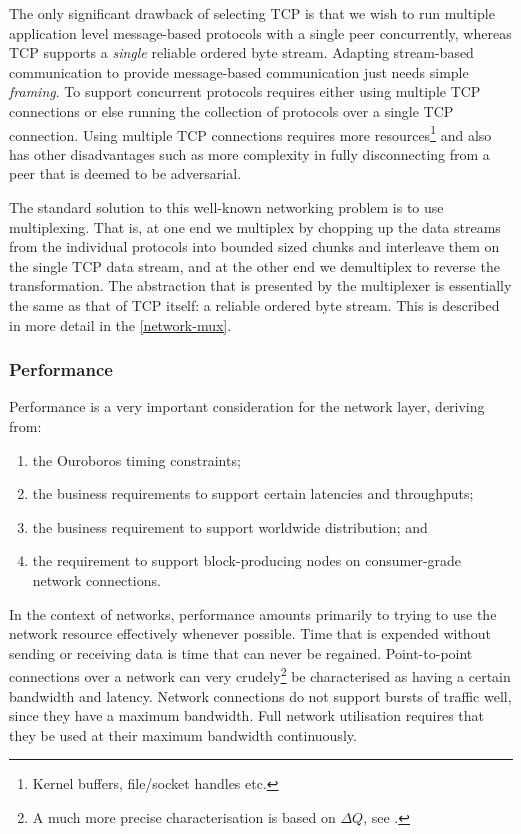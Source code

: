 \documentclass[11pt,a4paper]{article}
\begin{document}
The only significant drawback of selecting TCP is that we wish to run
multiple application level message-based protocols with a single peer
concurrently, whereas TCP supports a \emph{single} reliable ordered byte
stream. Adapting stream-based communication to provide message-based
communication just needs simple \emph{framing}. To support concurrent
protocols requires either using multiple TCP connections or else running
the collection of protocols over a single TCP connection. Using multiple
TCP connections requires more resources\footnote{Kernel buffers,
  file/socket handles etc.} and also has other disadvantages such as
more complexity in fully disconnecting from a peer that is deemed to be
adversarial.

The standard solution to this well-known networking problem is to use
multiplexing. That is, at one end we multiplex by chopping up the data
streams from the individual protocols into bounded sized chunks and
interleave them on the single TCP data stream, and at the other end we
demultiplex to reverse the transformation. The abstraction that is
presented by the multiplexer is essentially the same as that of TCP
itself: a reliable ordered byte stream. This is described in more detail
in the \cref{network-mux}.

\subsubsection{Performance}
\label{performance}

Performance is a very important consideration for the network layer,
deriving from:

\begin{enumerate}
\item
  the Ouroboros timing constraints;
\item
  the business requirements to support certain latencies and
  throughputs;
\item
  the business requirement to support worldwide distribution; and
\item
  the requirement to support block-producing nodes on consumer-grade
  network connections.
\end{enumerate}

In the context of networks, performance amounts primarily to trying to
use the network resource effectively whenever possible. Time that is
expended without sending or receiving data is time that can never be
regained. Point-to-point connections over a network can very
crudely\footnote{A much more precise characterisation is based on $\Delta{}Q$,
  see \cite{Comp20}.} be characterised as having a certain bandwidth and
latency. Network connections do not support bursts of traffic well,
since they have a maximum bandwidth. Full network utilisation requires
that they be used at their maximum bandwidth continuously.
\end{document}
